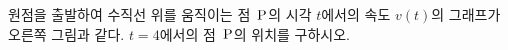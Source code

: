 \noindent\begin{minipage}[t]{0.58\linewidth}\vspace{0pt}\raggedright 원점을 출발하여 수직선 위를 움직이는 점~$\mathrm{P}$의 시각 $t$에서의 속도 $v(t)$의 그래프가 오른쪽 그림과 같다. $t=4$에서의 점~$\mathrm{P}$의 위치를 구하시오.\end{minipage}\hfill\begin{minipage}[t]{0.4\linewidth}\vspace{0pt}\centering \resizebox{\ifdim\width>\linewidth\linewidth\else\width\fi}{!}{}\end{minipage}\par
